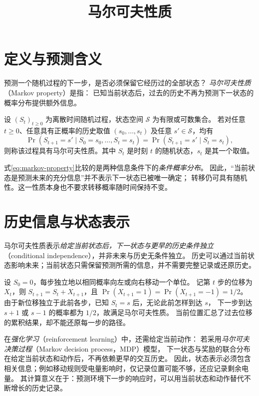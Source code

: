 \documentclass[UTF8,12pt,a4paper,fontset=fandol]{ctexart}
\title{马尔可夫性质}
\author{}
\date{}
\begin{document}
\maketitle

\section{定义与预测含义}
\label{sec:markov-property-definition}

预测一个随机过程的下一步，是否必须保留它经历过的全部状态？
\emph{马尔可夫性质}（Markov property）是指：
已知当前状态后，过去的历史不再为预测下一状态的概率分布提供额外信息。

\begin{definition}[离散状态下的马尔可夫性质]
设 $(S_t)_{t\geq 0}$ 为离散时间随机过程，状态空间 $\mathcal S$ 为有限或可数集合。
若对任意 $t\geq 0$、任意具有正概率的历史取值 $(s_0,\ldots,s_t)$ 及任意 $s'\in\mathcal S$，均有
\begin{equation}
  \Pr(S_{t+1}=s'\mid S_0=s_0,\ldots,S_t=s_t)
  =\Pr(S_{t+1}=s'\mid S_t=s_t),
  \label{eq:markov-property}
\end{equation}
则称该过程具有马尔可夫性质。其中 $S_t$ 是时刻 $t$ 的随机状态，$s_t$ 是其一个取值。
\end{definition}

式\eqref{eq:markov-property}比较的是两种信息条件下的\emph{条件概率分布}。
因此，“当前状态是预测未来的充分信息”并不表示下一状态已被唯一确定；
转移仍可具有随机性。这一性质本身也不要求转移概率随时间保持不变。

\section{历史信息与状态表示}
\label{sec:markov-property-history}

马尔可夫性质表示\emph{给定当前状态后，下一状态与更早的历史条件独立}
（conditional independence），并非未来与历史无条件独立。
历史可以通过当前状态影响未来；当前状态只需保留预测所需的信息，并不需要完整记录或还原历史。

\begin{example}[一维随机游走]
设 $S_0=0$，每步独立地以相同概率向左或向右移动一个单位。
记第 $t$ 步的位移为 $X_t$，则 $S_{t+1}=S_t+X_{t+1}$，且
$\Pr(X_{t+1}=1)=\Pr(X_{t+1}=-1)=1/2$。
由于新位移独立于此前各步，已知 $S_t=s$ 后，无论此前怎样到达 $s$，
下一步到达 $s+1$ 或 $s-1$ 的概率都为 $1/2$，故满足马尔可夫性质。
当前位置汇总了过去位移的累积结果，却不能还原每一步的路径。
\end{example}

在\emph{强化学习}（reinforcement learning）中，还需给定当前动作：
若采用\emph{马尔可夫决策过程}（Markov decision process，MDP）模型，
下一状态与奖励的联合分布在给定当前状态和动作后，不再依赖更早的交互历史。
因此，状态表示必须包含相关信息；例如移动规则受电量影响时，仅记录位置可能不够，还应记录剩余电量。
其计算意义在于：预测环境下一步的响应时，可以用当前状态和动作替代不断增长的历史记录。
\end{document}
